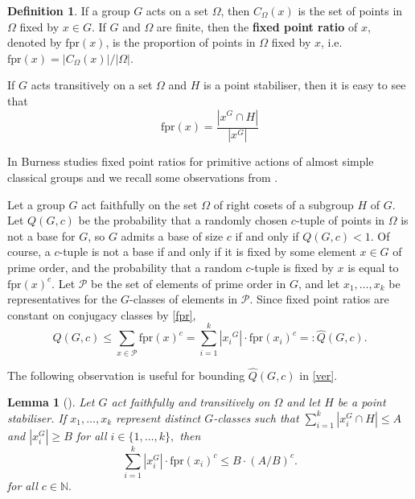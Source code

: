 \documentclass[a4paper,reqno,11pt]{amsart}
\newtheorem{Lem}[Th]{Lemma}
\theoremstyle{definition}
\newtheorem{Def}[Th]{Definition}
\theoremstyle{remark}
\numberwithin{equation}{section}
\newcommand{\fpr}{{\mathrm{fpr}}}
\begin{document}
\begin{Def}
If a group $G$ acts on a set $\Omega$, then   $C_{\Omega}(x)$ is the set of points in $\Omega$  fixed
by   $x \in G$. If $G$ and $\Omega$ are finite, then  the {\bf fixed point ratio}  of $x$, 
denoted  by $\fpr(x)$, is the proportion of points in $\Omega$ fixed by $x$, i.e. $\fpr(x) = |C_{\Omega}(x)|/|\Omega|.$
\end{Def}




If  $G$ acts transitively on a set $\Omega$  and $H$ is a point stabiliser,  then it is easy to see that
\begin{equation}\label{fpr}
\fpr(x)= \frac{|x^{G} \cap H|}{|x^G|}
\end{equation}


 In \cite{fpr, fpr2, fpr3, fpr4} Burness studies   fixed point ratios for primitive actions of almost simple classical groups and we recall some  observations from \cite{fpr}.
 
Let a group $G$ act faithfully   on the set $\Omega$ of right cosets of a subgroup $H$ of $G.$  
Let $Q(G, c)$ be the probability that
a randomly chosen $c$-tuple of points in $\Omega$ is not a base for $G$, so $G$ admits a base of size $c$ if and
only if $Q(G, c) < 1$. Of course, a $c$-tuple is not a  base if and only if it is fixed by some element  $x \in G$ of prime order, and the probability that a random $c$-tuple is fixed
by $x$ is equal to $\fpr(x)^c$. Let $\mathscr{P}$ be the set of elements of prime order in ${G}$, and let ${x}_1, \ldots, {x}_k$
be representatives for the ${G}$-classes of elements in $\mathscr{P}$. Since  fixed point
ratios are constant on conjugacy classes by  \eqref{fpr}, 
\begin{equation}\label{ver}
Q(G,c) \le \sum_{{x} \in \mathscr{P}}\fpr({x})^c = \sum_{i=1}^{k}|{x_i}^{{G}}|\cdot\fpr({x}_i)^c=:\widehat{Q}(G,c).
\end{equation}

The following observation is useful for bounding $\widehat{Q}(G,c)$ in \eqref{ver}.
 
\begin{Lem}[{\cite[Lemma 2.1]{burness}}]
\label{fprAB}
Let $G$ act faithfully and transitively on $\Omega$ and let $H$ be a point stabiliser. If  $x_1,\ldots,x_k$ represent distinct $G$-classes such that $\sum_{i=1}^k |x_i^G \cap  H| \le A$ and $|x_i^G| \ge B$ for all $i \in \{1, \ldots, k\},$ then
$$\sum_{i=1}^k |x_i^G| \cdot \fpr (x_i)^c \le B \cdot (A/B)^c.$$ 
for all $c \in \mathbb{N}.$
\end{Lem}
\end{document}
